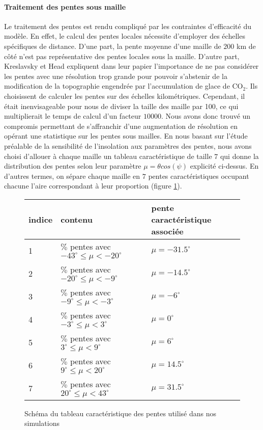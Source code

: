 \documentclass[11pt,a4paper]{article}
\begin{document}
\paragraph{Traitement des pentes sous maille \\}
Le traitement des pentes est rendu compliqué par les contraintes d'efficacité du modèle. En effet, le calcul des pentes locales nécessite d'employer des échelles spécifiques de distance. D'une part, la pente moyenne d'une maille de $200$ km de côté n'est pas représentative des pentes locales sous la maille. D'autre part, Kreslavsky et Head expliquent dans leur papier \citep{Kres:05} l'importance de ne pas considérer les pentes avec une résolution trop grande pour pouvoir s'abstenir de la modification de la topographie engendrée par l'accumulation de glace de CO$_2$. Ils choisissent de calculer les pentes sur des échelles kilométriques. Cependant, il était inenvisageable pour nous de diviser la taille des maille par 100, ce qui multiplierait le temps de calcul d'un facteur $10000$. Nous avons donc trouvé un compromis permettant de s'affranchir d'une augmentation de résolution en opérant une statistique sur les pentes sous mailles. En nous basant sur l'étude préalable de la sensibilité de l'insolation aux paramètres des pentes, nous avons choisi d'allouer à chaque maille un tableau caractéristique de taille $7$ qui donne la distribution des pentes selon leur paramètre $\mu = \theta cos(\psi)$  explicité ci-dessus. En d'autres termes, on sépare chaque maille en $7$ pentes caractéristiques occupant chacune l'aire correspondant à leur proportion (figure \ref{subslope_dist}).  \\ 

\begin{figure}[h!]
\begin{center}
\begin{tabular}[centered]{| l | l | | l |}
\hline
indice & contenu & pente caractéristique associée \\
\hline \hline
1 & $\%$ pentes avec $-43^\circ \leq \mu<-20^\circ$ & $\mu = -31.5^\circ$\\ \hline
2 & $\%$ pentes avec $-20^\circ \leq \mu<-9^\circ$ & $\mu = -14.5^\circ$\\ \hline
3 & $\%$ pentes avec $-9^\circ \leq \mu<-3^\circ$ & $\mu = -6^\circ$\\ \hline
4 & $\%$ pentes avec $-3^\circ \leq \mu<3^\circ$ & $\mu = 0^\circ$\\ \hline
5 & $\%$ pentes avec $3^\circ \leq \mu<9^\circ$ & $\mu = 6^\circ$\\ \hline
6 & $\%$ pentes avec $9^\circ \leq \mu<20^\circ$ & $\mu = 14.5^\circ$\\ \hline
7 & $\%$ pentes avec $20^\circ \leq \mu<43^\circ$ & $\mu = 31.5^\circ$\\ \hline
\end{tabular}
\caption{Schéma du tableau caractéristique des pentes utilisé dans nos simulations}
\label{subslope_dist}
\end{center}
\end{figure}
\end{document}

